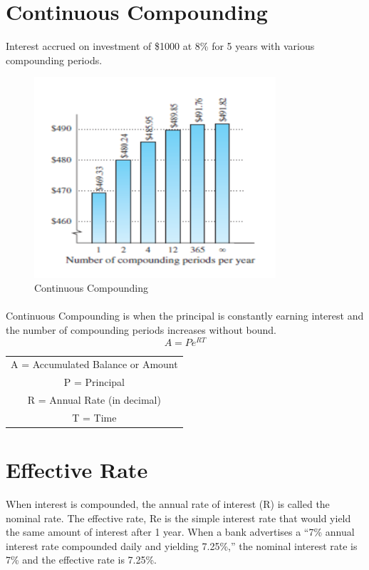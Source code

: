 \documentclass{article}
\begin{document}
	\newpage
	\section{Continuous Compounding}
		Interest accrued on investment of \$1000 at 8\% for 5 years with various compounding periods. \\
		\begin{figure}[h!]
			\caption{Continuous Compounding}
			\label{fig 1}
			\centering
			\includegraphics[width = 0.8\textwidth]{CA_pic.png}
		\end{figure}
		\paragraph{ }
		Continuous Compounding is when the principal is constantly earning interest and the number of compounding periods increases without bound.
		\begin{equation*}
			A = Pe^{RT} 
		\end{equation*}
		
			\begin{table}[h!]
				\centering
				\begin{tabular}{|c|}
					\hline
					A = Accumulated Balance or Amount\\
					P = Principal\\
					R = Annual Rate (in decimal)\\
					T = Time\\
					\hline
				\end{tabular}
			\end{table}
	
	\newpage	
	\section{Effective Rate}
		When interest is compounded, the annual rate of interest (R) is called the nominal rate.
		The effective rate, Re is the simple interest rate that would yield the same amount of interest after 1 year.
		When a bank advertises a “7\% annual interest rate compounded daily and yielding 7.25\%,” the nominal interest rate is 7\% and the effective rate is 7.25\%.
		
\end{document}
